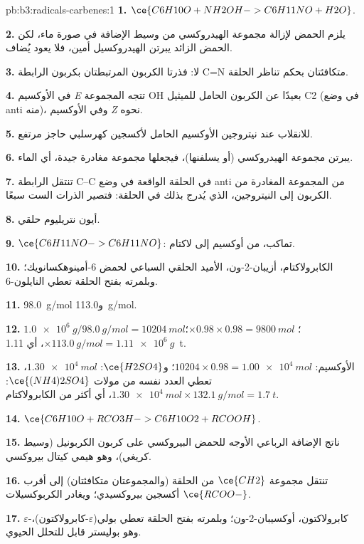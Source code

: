 \begin{solution}{pb:b3:radicals-carbenes:1}
\textbf{1.} $\ce{C6H10O + NH2OH -> C6H11NO + H2O}$.

\textbf{2.} يلزم الحمض لإزالة مجموعة الهيدروكسي من وسيط الإضافة في صورة
ماء، لكن الحمض الزائد يبرتن الهيدروكسيل أمين، فلا يعود يُضاف.

\textbf{3.} لا: فذرتا الكربون المرتبطتان بكربون الرابطة C=N متكافئتان بحكم
تناظر الحلقة.

\textbf{4.} في الأوكسيم \textit{E} تتجه المجموعة OH بعيدًا عن الكربون الحامل للميثيل C2 (في وضع anti
منه)، وفي الأوكسيم \textit{Z} نحوه.

\textbf{5.} للانقلاب عند نيتروجين الأوكسيم الحامل لأكسجين كهرسلبي حاجز
مرتفع.

\textbf{6.} يبرتن مجموعة الهيدروكسي (أو يسلفنها)، فيجعلها مجموعة مغادرة
جيدة، أي الماء.

\textbf{7.} تنتقل الرابطة C--C في الحلقة الواقعة في وضع anti من المجموعة المغادرة من الكربون إلى النيتروجين،
الذي يُدرج بذلك في الحلقة: فتصير الذرات الست سبعًا.

\textbf{8.} أيون نتريليوم حلقي.

\textbf{9.} $\ce{C6H11NO -> C6H11NO}$: تماكب، من أوكسيم إلى لاكتام.

\textbf{10.} الكابرولاكتام، أزيبان-2-ون، الأميد الحلقي السباعي لحمض
6-أمينوهكسانويك؛ وبلمرته بفتح الحلقة تعطي النايلون-6.

\textbf{11.} \qty{98.0}{g/mol} و\qty{113.0}{g/mol}.

\textbf{12.} $\qty{1.0e6}{g}/\qty{98.0}{g/mol} = \qty{10204}{mol}$؛ $\times 0.98 \times 0.98 = \qty{9800}{mol}$؛ $\times \qty{113.0}{g/mol} = \qty{1.11e6}{g}$، أي \qty{1.11}{t}.

\textbf{13.} الأوكسيم: $\num{10204} \times 0.98 = \qty{1.00e4}{mol}$؛ و$\ce{H2SO4}$: $\qty{1.30e4}{mol}$، تعطي العدد نفسه من مولات
$\ce{(NH4)2SO4}$: $\qty{1.30e4}{mol} \times \qty{132.1}{g/mol} = \qty{1.7}{t}$، أي أكثر من الكابرولاكتام.

\textbf{14.} $\ce{C6H10O + RCO3H -> C6H10O2 + RCOOH}$.

\textbf{15.} ناتج الإضافة الرباعي الأوجه للحمض البيروكسي على كربون الكربونيل (وسيط
كريغي)، وهو هيمي كيتال بيروكسي.

\textbf{16.} تنتقل مجموعة $\ce{CH2}$ من الحلقة (والمجموعتان متكافئتان) إلى أقرب أكسجين
بيروكسيدي؛ ويغادر الكربوكسيلات $\ce{RCOO-}$.

\textbf{17.} $\varepsilon$-كابرولاكتون، أوكسيبان-2-ون؛ وبلمرته بفتح الحلقة تعطي
بولي($\varepsilon$-كابرولاكتون)، وهو بوليستر قابل للتحلل الحيوي.


\end{solution}
